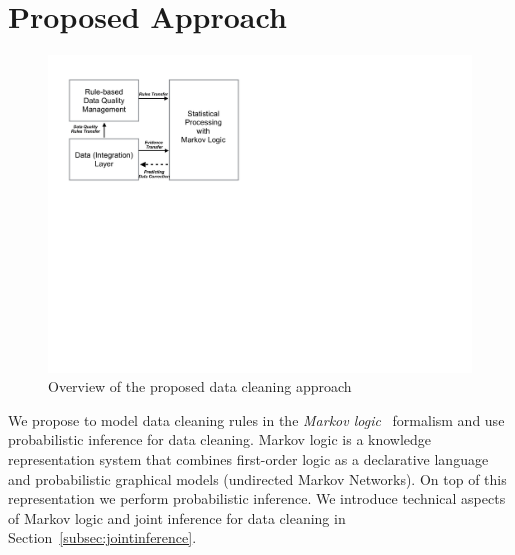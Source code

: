 
\section{Proposed Approach}
\label{sec:method}


 \begin{figure}[t]
 \centering
 \includegraphics[width=0.9\columnwidth]{img/system.pdf}
 \caption{%
Overview of the proposed data cleaning approach
}
 \label{fig:system}
\end{figure}     

We propose to model data cleaning rules in the \textit{Markov logic}~\cite{domingos2009markov} formalism and use probabilistic inference for data cleaning. Markov logic is a knowledge representation system that combines first-order logic as a declarative language and probabilistic graphical models (undirected Markov Networks). On top of this representation we perform probabilistic inference. We introduce technical aspects of Markov logic and joint inference for data cleaning in Section~\ref{subsec:jointinference}.

